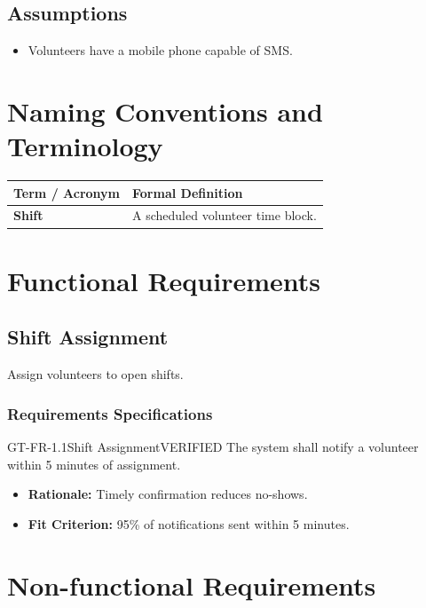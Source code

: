 \documentclass[11pt,a4paper]{article}
\begin{document}
\subsection{Assumptions}
\begin{itemize}[leftmargin=*]
    \item Volunteers have a mobile phone capable of SMS.
\end{itemize}

\section{Naming Conventions and Terminology}
\begin{table}[h!]
\centering
\begin{tabularx}{\linewidth}{l X}
\toprule
\textbf{Term / Acronym} & \textbf{Formal Definition} \\
\midrule
\textbf{Shift} & A scheduled volunteer time block. \\
\bottomrule
\end{tabularx}
\end{table}

\section{Functional Requirements}
\subsection{Shift Assignment}
Assign volunteers to open shifts.

\subsubsection*{Requirements Specifications}
\begin{requirementbox}{GT-FR-1.1}{Shift Assignment}{VERIFIED}
The system shall notify a volunteer within 5 minutes of assignment.
\begin{itemize}[leftmargin=*,itemsep=2pt,topsep=4pt]
    \item \textbf{Rationale:} Timely confirmation reduces no-shows.
    \item \textbf{Fit Criterion:} 95\% of notifications sent within 5 minutes.
\end{itemize}
\end{requirementbox}

\section{Non-functional Requirements}
\end{document}
